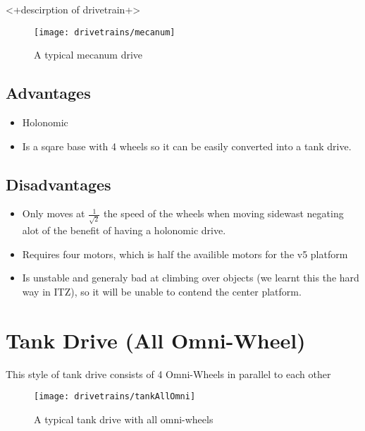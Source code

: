 \documentclass[../../main.tex]{subfiles}
\begin{document}
<+descirption of drivetrain+>

\begin{figure}[h]
	\centering

	\texttt{[image: drivetrains/mecanum]}
	\caption{A typical mecanum drive}
	\label{fig:drivetrainMecanum}
\end{figure}

\subsection{Advantages}

\begin{itemize}
	\item Holonomic
	\item Is a sqare base with 4 wheels so it can be easily converted
	      into a tank drive.
\end{itemize}

\subsection{Disadvantages}

\begin{itemize}
	\item Only moves at $\frac{1}{\sqrt{2}}$ the speed of the wheels when
	      moving sidewast
	      negating alot of the benefit of having a holonomic drive.
	\item Requires four motors, which is half the availible motors for the
	      v5 platform
	\item Is unstable and generaly bad at climbing over objects (we learnt
	      this the hard
	      way in ITZ), so it will be unable to contend the center platform.
\end{itemize}

\section{Tank Drive (All Omni-Wheel)}

This style of tank drive consists of 4 Omni-Wheels in parallel to each other 

\begin{figure}[h] \centering 

	\texttt{[image: drivetrains/tankAllOmni]} \caption{A typical tank drive with all omni-wheels} \label{fig:drivetrainTankAllOmni} \end{figure} 
\end{document}

